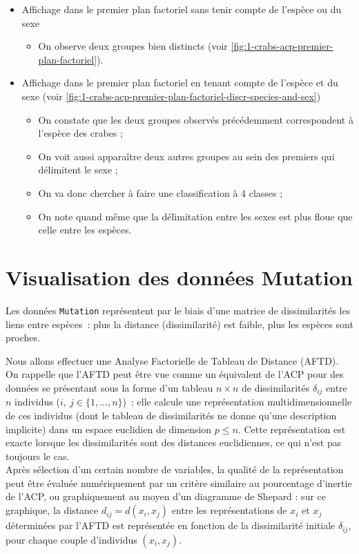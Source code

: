 \documentclass[a4paper,10pt]{report}
\begin{document}
\begin{itemize}
	\item Affichage dans le premier plan factoriel sans tenir compte de l'espèce ou du sexe
	\begin{itemize}
		\item On observe deux groupes bien distincts (voir \autoref{fig:1-crabs-acp-premier-plan-factoriel}).
	\end{itemize}
	
	\item Affichage dans le premier plan factoriel en tenant compte de l'espèce et du sexe (voir \autoref{fig:1-crabs-acp-premier-plan-factoriel-discr-species-and-sex})
	\begin{itemize}
		\item On constate que les deux groupes observés précédemment correspondent à l'espèce des crabes ;
		\item On voit aussi apparaître deux autres groupes au sein des premiers qui délimitent le sexe ;
		\item On va donc chercher à faire une classification à 4 classes ;
		\item On note quand même que la délimitation entre les sexes est plus floue que celle entre les espèces.
	\end{itemize}
\end{itemize}



\section{Visualisation des données Mutation}

Les données \texttt{Mutation} représentent par le biais d'une matrice de dissimilarités les liens entre espèces~: plus la distance (dissimilarité) est faible, plus les espèces sont proches.

Nous allons effectuer une Analyse Factorielle de Tableau de Distance (AFTD). On rappelle que l’AFTD peut être vue comme un équivalent de l’ACP pour des données se présentant sous la forme d’un tableau $n \times n$ de dissimilarités $\delta_{ij}$ entre $n$ individus ($i,\ j \in \{1,...,n\}$)~: elle calcule une représentation multidimensionnelle de ces individus (dont le tableau de dissimilarités ne donne qu’une description implicite) dans un espace euclidien de dimension $p \leqslant n$. Cette représentation est exacte lorsque les dissimilarités sont des distances euclidiennes, ce qui n'est pas toujours le cas.
\\Après sélection d’un certain nombre de variables, la qualité de la représentation peut être évaluée numériquement par un critère similaire au pourcentage d’inertie de l’ACP, ou graphiquement au moyen d’un diagramme de Shepard : sur ce graphique, la distance $d_{ij} = d(x_i,x_j)$ entre les représentations de $x_i$ et $x_j$ déterminées par l’AFTD est représentée en fonction de la dissimilarité initiale $\delta_{ij}$, pour chaque couple d’individus $(x_i,x_j)$.
\end{document}
